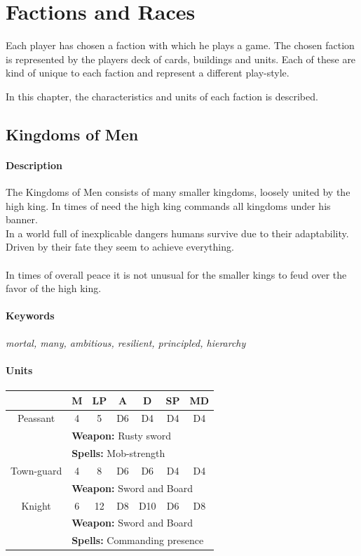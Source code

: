 \documentclass[a5paper,pagesize,10pt,bibtotoc,pointlessnumbers,
normalheadings,DIV=9,twoside=false]{scrbook}
\begin{document}
\chapter{Factions and Races}
Each player has chosen a faction with which he plays a game. The chosen faction is represented by the players deck of cards, buildings and units. Each of these are kind of unique to each faction and represent a different play-style.

In this chapter, the characteristics and units of each faction is described.
\newpage
\section{Kingdoms of Men}

\subsubsection{Description}
The Kingdoms of Men consists of many smaller kingdoms, loosely united by the high king. In times of need the high king commands all kingdoms under his banner.\\
In a world full of inexplicable dangers humans survive due to their adaptability. Driven by their fate they seem to achieve everything.\\
\\
In times of overall peace it is not unusual for the smaller kings to feud over the favor of the high king.

\subsubsection{Keywords}
\emph{mortal, many, ambitious, resilient, principled, hierarchy}

\subsubsection{Units}
 \begin{tabular}{||c c c c c c c||} 
 \hline
  & M & LP & A & D & SP & MD \\
 \hline\hline
 Peassant & 4 & 5 & D6 & D4 & D4 & D4 \\ 
  & \multicolumn{6}{l||}{\textbf{Weapon:} Rusty sword} \\
  & \multicolumn{6}{l||}{\textbf{Spells:} Mob-strength} \\
 \hline
  Town-guard & 4 & 8 & D6 & D6 & D4 & D4 \\ 
  & \multicolumn{6}{l||}{\textbf{Weapon:} Sword and Board} \\
 \hline
 Knight & 6  & 12 & D8 & D10 & D6 & D8 \\
  & \multicolumn{6}{l||}{\textbf{Weapon:} Sword and Board} \\
  & \multicolumn{6}{l||}{\textbf{Spells:} Commanding presence} \\
  \hline

\end{tabular}
\end{document}
